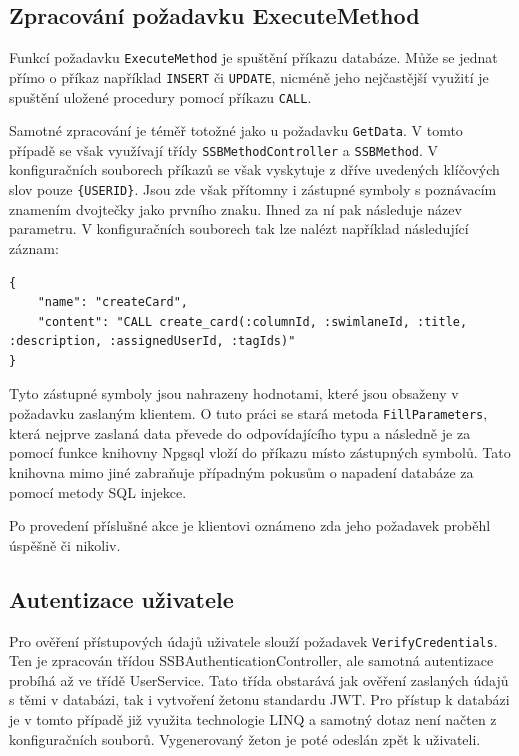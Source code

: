 \subsection{Zpracování požadavku ExecuteMethod}
Funkcí požadavku \texttt{ExecuteMethod} je spuštění příkazu databáze. Může se jednat přímo o příkaz například \texttt{INSERT} či \texttt{UPDATE}, nicméně jeho nejčastější využití je spuštění uložené procedury pomocí příkazu \texttt{CALL}.

Samotné zpracování je téměř totožné jako u požadavku \texttt{GetData}. V tomto případě se však využívají třídy \texttt{SSBMethodController} a \texttt{SSBMethod}. V konfiguračních souborech příkazů se však vyskytuje z dříve uvedených klíčových slov pouze \texttt{\{USERID\}}. Jsou zde však přítomny i zástupné symboly s poznávacím znamením dvojtečky jako prvního znaku. Ihned za ní pak následuje název parametru. V konfiguračních souborech tak lze nalézt například následující záznam:

\begin{verbatim}
{
    "name": "createCard",
    "content": "CALL create_card(:columnId, :swimlaneId, :title, :description, :assignedUserId, :tagIds)"
}
\end{verbatim}

Tyto zástupné symboly jsou nahrazeny hodnotami, které jsou obsaženy v požadavku zaslaným klientem. O tuto práci se stará metoda \texttt{FillParameters}, která nejprve zaslaná data převede do odpovídajícího typu a následně je za pomocí funkce knihovny Npgsql vloží do příkazu místo zástupných symbolů. Tato knihovna mimo jiné zabraňuje případným pokusům o napadení databáze za pomocí metody SQL injekce. 

Po provedení příslušné akce je klientovi oznámeno zda jeho požadavek proběhl úspěšně či nikoliv.

\subsection{Autentizace uživatele}
Pro ověření přístupových údajů uživatele slouží požadavek \texttt{VerifyCredentials}. Ten je zpracován třídou SSBAuthenticationController, ale samotná autentizace probíhá až ve třídě UserService. Tato třída obstarává jak ověření zaslaných údajů s těmi v databázi, tak i vytvoření žetonu standardu JWT. Pro přístup k databázi je v tomto případě již využita technologie LINQ a samotný dotaz není načten z konfiguračních souborů. Vygenerovaný žeton je poté odeslán zpět k uživateli.



